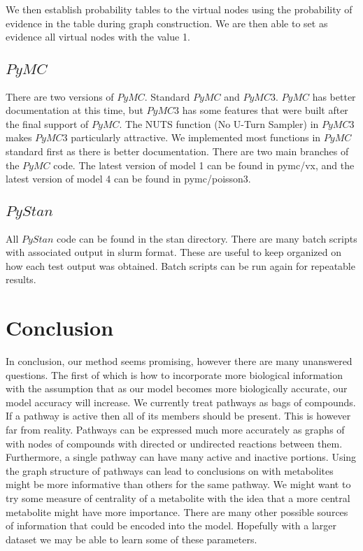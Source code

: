 \documentclass[11pt]{article}
\begin{document}
We then establish probability tables to the virtual nodes using the probability of evidence in the table during graph construction. We are then able to set as evidence all virtual nodes with the value 1. 

\subsection{$PyMC$}

There are two versions of $PyMC$. Standard $PyMC$ and $PyMC3$. $PyMC$ has better documentation at this time, but $PyMC3$ has some features that were built after the final support of $PyMC$. The NUTS function (No U-Turn Sampler) in $PyMC3$ makes $PyMC3$ particularly attractive. We implemented most functions in $PyMC$ standard first as there is better documentation. There are two main branches of the $PyMC$ code. The latest version of model 1 can be found in pymc/vx, and the latest version of model 4 can be found in pymc/poisson3.

\subsection{$PyStan$}

All $PyStan$ code can be found in the stan directory. There are many batch scripts with associated output in slurm format. These are useful to keep organized on how each test output was obtained. Batch scripts can be run again for repeatable results. 

\section{Conclusion}

In conclusion, our method seems promising, however there are many unanswered questions. The first of which is how to incorporate more biological information with the assumption that as our model becomes more biologically accurate, our model accuracy will increase. We currently treat pathways as bags of compounds. If a pathway is active then all of its members should be present. This is however far from reality. Pathways can be expressed much more accurately as graphs of with nodes of compounds with directed or undirected reactions between them. Furthermore, a single pathway can have many active and inactive portions. Using the graph structure of pathways can lead to conclusions on with metabolites might be more informative than others for the same pathway. We might want to try some measure of centrality of a metabolite with the idea that a more central metabolite might have more importance. There are many other possible sources of information that could be encoded into the model. Hopefully with a larger dataset we may be able to learn some of these parameters. 
\end{document}

